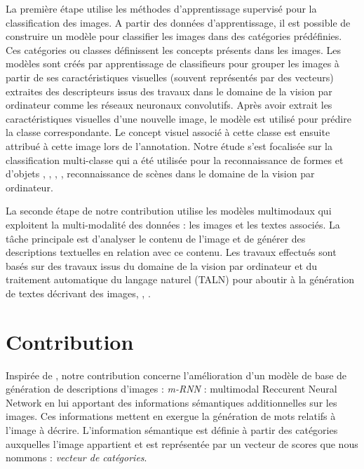 La première étape utilise les méthodes d'apprentissage supervisé pour la classification des images. A partir des données d'apprentissage, il est possible de construire un modèle pour classifier les images dans des catégories prédéfinies. Ces catégories ou classes définissent les concepts présents dans les images.
 Les modèles sont créés par apprentissage de classifieurs pour grouper les images à partir de ses caractéristiques visuelles  (souvent représentés par des vecteurs) extraites des descripteurs issus des travaux dans le domaine de la vision par ordinateur comme les réseaux neuronaux convolutifs. Après avoir extrait les caractéristiques visuelles d'une nouvelle image, le modèle est utilisé pour prédire la classe correspondante. Le concept visuel associé à cette classe est ensuite attribué à cette image lors de l'annotation.
Notre étude s'est focalisée sur la classification multi-classe qui a été utilisée pour la reconnaissance de formes et d'objets \cite{krizhevsky2012imagenet}, \cite{simonyan2014very}, \cite{szegedy2015going}, \cite{sharif2014cnn}, reconnaissance de scènes \cite{zhou2014learning} dans le domaine de la vision par ordinateur.

La seconde étape de notre contribution utilise les modèles multimodaux qui exploitent la multi-modalité des données : les images et les textes associés. La tâche principale est d'analyser le contenu de l'image et de générer des descriptions textuelles en relation avec ce contenu. Les travaux effectués sont basés sur des travaux issus du domaine de la vision par ordinateur et du traitement automatique du langage naturel (TALN) pour aboutir à la génération de textes décrivant des images\cite{murthy2015automatic}, \cite{yan2015deep},\cite{fang2015captions} \cite{karpathy2015deep}.\\

\medskip
\section{Contribution}
\medskip

\qquad Inspirée de \cite{xu2015show} \cite{jia2015guiding}, notre contribution concerne l'amélioration d'un modèle de base de génération de descriptions d'images : \textit{m-RNN} : multimodal Reccurent Neural Network \cite{mao2014explain} \cite{mao2014deep} \cite{mao2015learning} en lui apportant des  informations sémantiques additionnelles sur les images. Ces informations mettent en exergue la génération de mots relatifs à l'image à décrire. L'information sémantique est définie à partir des catégories auxquelles l'image appartient et est représentée par un vecteur de scores que nous nommons : \textit{vecteur de catégories}.\\


